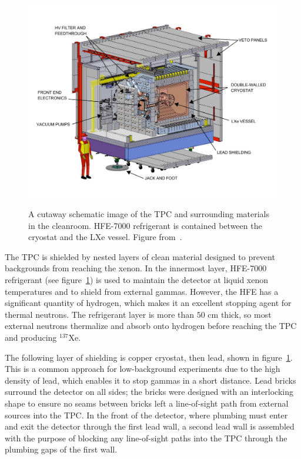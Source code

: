 \begin{figure}
\begin{center}
\includegraphics[keepaspectratio=true,width=\textwidth]{cleanroom.pdf}
\end{center}
\renewcommand{\baselinestretch}{1}
\small\normalsize
\begin{quote}
\caption{A cutaway schematic image of the TPC and surrounding materials in the cleanroom.  HFE-7000 refrigerant is contained between the cryostat and the LXe vessel.  Figure from~\cite{detectorPartI}.}
\label{fig:CleanRoomCutaway}
\end{quote}
\end{figure}
\renewcommand{\baselinestretch}{2}
\small\normalsize

The TPC is shielded by nested layers of clean material designed to prevent backgrounds from reaching the xenon.  In the innermost layer, HFE-7000 refrigerant (see figure~\ref{fig:CleanRoomCutaway}) is used to maintain the detector at liquid xenon temperatures and to shield from external gammas.  However, the HFE has a significant quantity of hydrogen, which makes it an excellent stopping agent for thermal neutrons.  The refrigerant layer is more than $50$ cm thick, so most external neutrons thermalize and absorb onto hydrogen before reaching the TPC and producing $^{137}$Xe.~\cite{detectorPartI}

The following layer of shielding is copper cryostat, then lead, shown in figure~\ref{fig:CleanRoomCutaway}.  This is a common approach for low-background experiments due to the high density of lead, which enables it to stop gammas in a short distance.  Lead bricks surround the detector on all sides; the bricks were designed with an interlocking shape to ensure no seams between bricks left a line-of-sight path from external sources into the TPC.  In the front of the detector, where plumbing must enter and exit the detector through the first lead wall, a second lead wall is assembled with the purpose of blocking any line-of-sight paths into the TPC through the plumbing gaps of the first wall.~\cite{detectorPartI}

